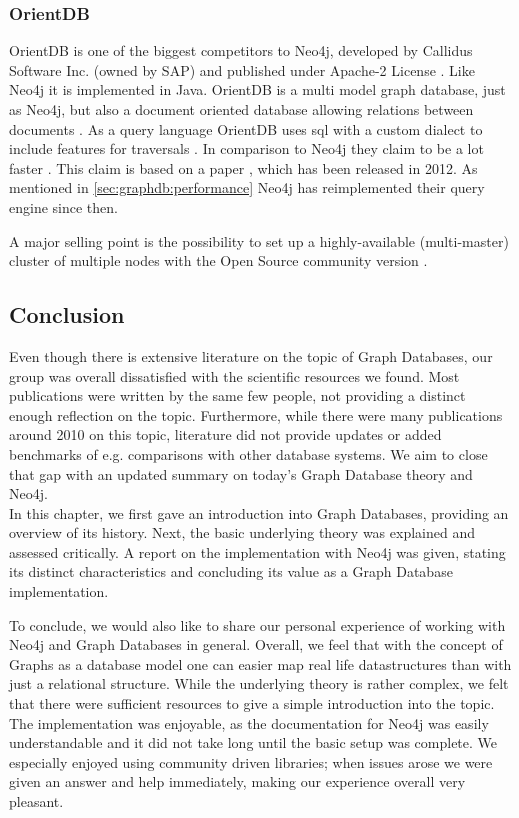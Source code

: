 \subsubsection{OrientDB}
OrientDB is one of the biggest competitors to Neo4j, developed by Callidus Software Inc. (owned by SAP) and published under Apache-2 License \autocite{orientdb:vs_neo4j}.
Like Neo4j it is implemented in Java.
OrientDB is a multi model graph database, just as Neo4j, but also a document oriented database allowing relations between documents \autocite{orientdb:why}.
As a query language OrientDB uses \gls{sql} with a custom dialect to include features for traversals \autocite{orientdb:vs_neo4j}.
In comparison to Neo4j they claim to be a lot faster \autocite{orientdb:vs_neo4j}.
This claim is based on a paper \autocite{cloudcom:2012}, which has been released in 2012.
As mentioned in \autoref{sec:graphdb:performance} Neo4j has reimplemented their query engine since then.


A major selling point is the possibility to set up a highly-available (multi-master) cluster of multiple nodes with the Open Source community version \autocite{orientdb:cluster, orientdb:support}.

\subsection{Conclusion}
Even though there is extensive literature on the topic of Graph Databases, our group was overall dissatisfied with the scientific resources we found. Most publications were written by the same few people, not providing a distinct enough reflection on the topic. Furthermore, while there were many publications around 2010 on this topic, literature did not provide updates or added benchmarks of e.g. comparisons with other database systems. We aim to close that gap with an updated summary on today's Graph Database theory and Neo4j. \\
In this chapter, we first gave an introduction into Graph Databases, providing an overview of its history. Next, the basic underlying theory was explained and assessed critically. A report on the implementation with Neo4j was given, stating its distinct characteristics and concluding its value as a Graph Database implementation.

To conclude, we would also like to share our personal experience of working with Neo4j and Graph Databases in general. Overall, we feel that with the concept of Graphs as a database model one can easier map real life datastructures than with just a relational structure. While the underlying theory is rather complex, we felt that there were sufficient resources to give a simple introduction into the topic. The implementation was enjoyable, as the documentation for Neo4j was easily understandable and it did not take long until the basic setup was complete. We especially enjoyed using community driven libraries; when issues arose we were given an answer and help immediately, making our experience overall very pleasant.

